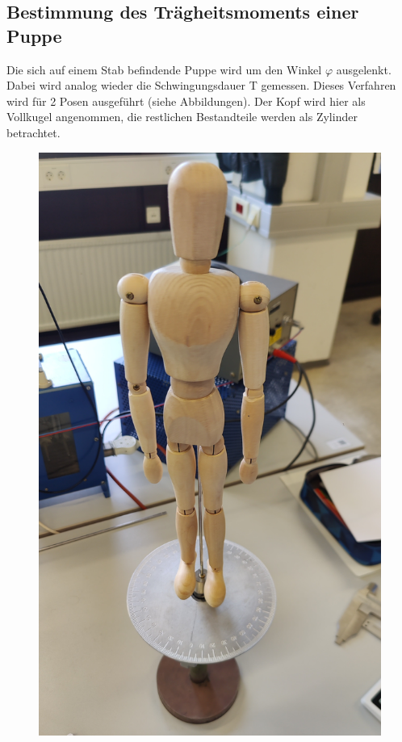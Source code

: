 \subsection{Bestimmung des Trägheitsmoments einer Puppe}
\label{sec:Durchführung}
Die sich auf einem Stab befindende Puppe wird um den Winkel $\varphi$ 
ausgelenkt. Dabei wird analog wieder die Schwingungsdauer T gemessen. Dieses
Verfahren wird für 2 Posen ausgeführt (siehe Abbildungen). Der Kopf wird
hier als Vollkugel angenommen, die restlichen Bestandteile werden als Zylinder
betrachtet.
\begin{figure}[h]
    \centering
    \begin{minipage}{0.45\textwidth}
        \centering
        \includegraphics[width=\textwidth]{Bilder/abb3.jpg}

\end{minipage}
\end{figure}
